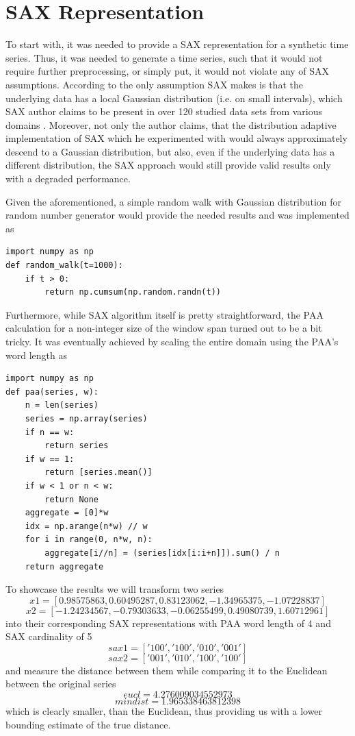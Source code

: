 \documentclass{article}
\begin{document}
\section{SAX Representation}
To start with, it was needed to provide a SAX representation for a synthetic time series. Thus, it was needed to generate a time series, such that it would not require further preprocessing, or simply put, it would not violate any of SAX assumptions. According to \cite{shieh2008sax} the only assumption SAX makes is that the underlying data has a local Gaussian distribution (i.e. on small intervals), which SAX author claims to be present in over 120 studied data sets from various domains \cite{keogh2006sax_presentation}. Moreover, not only the author claims, that the distribution adaptive implementation of SAX which he experimented with would always approximately descend to a Gaussian distribution, but also, even if the underlying data has a different distribution, the SAX approach would still provide valid results only with a degraded performance.\par
Given the aforementioned, a simple random walk with Gaussian distribution for random number generator would provide the needed results and was implemented as
\begin{lstlisting}
import numpy as np
def random_walk(t=1000):
    if t > 0:
        return np.cumsum(np.random.randn(t))
\end{lstlisting}
Furthermore, while SAX algorithm itself is pretty straightforward, the PAA \cite{keogh2001dimensionality} calculation for a non-integer size of the window span turned out to be a bit tricky. It was eventually achieved by scaling the entire domain using the PAA's word length as
\begin{lstlisting}
import numpy as np
def paa(series, w):
    n = len(series)
    series = np.array(series)
    if n == w:
        return series
    if w == 1:
        return [series.mean()]
    if w < 1 or n < w:
        return None
    aggregate = [0]*w
    idx = np.arange(n*w) // w
    for i in range(0, n*w, n):
        aggregate[i//n] = (series[idx[i:i+n]]).sum() / n
    return aggregate
\end{lstlisting}
To showcase the results we will transform two series
$$x1=[ 0.98575863,  0.60495287,  0.83123062, -1.34965375, -1.07228837]$$
$$x2=[-1.24234567, -0.79303633, -0.06255499,  0.49080739,  1.60712961]$$
into their corresponding SAX representations with PAA word length of 4 and SAX cardinality of 5
$$sax1=['100', '100', '010', '001']$$
$$sax2=['001', '010', '100', '100']$$
and measure the distance between them while comparing it to the Euclidean between the original series
$$eucl=4.276009034552973$$
$$mindist=1.965338463812398$$
which is clearly smaller, than the Euclidean, thus providing us with a lower bounding estimate of the true distance.
\end{document}
